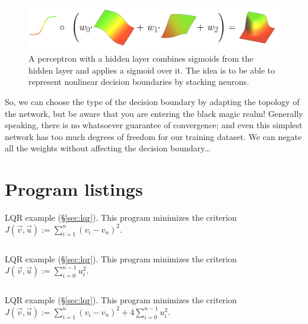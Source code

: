 \documentclass[notitlepage,oneside]{book}
\makeatletter
\newcommand{\authoredby}[1]{\addtocontents{toc}{\protect\@nameuse{authoredby#1}}}%
\makeatother
\begin{document}
\begin{figure}[t]
    \centering
    \includegraphics[width=.9\linewidth]{3n.jpg}
    \caption{A perceptron with a hidden layer combines sigmoids from the hidden layer and applies a sigmoid over it.
    The idea is to be able to represent nonlinear decision boundaries by stacking neurons.}
    \label{fig:sigmoids}
\end{figure}

So, we can choose the type of the decision boundary by adapting the topology of the network, but be aware that you are entering the black magic realm!
Generally speaking, there is no whatsoever guarantee of convergence; and even this simplest network has too much degrees of freedom for our training dataset.
We can negate all the weights without affecting the decision boundary\dots


\appendix
\authoredby{B}
\chapter{Program listings}
\fancyhead[R]{\textcolor{green}{core text}}

\begin{listing}[p]
\caption{LQR example (\S\ref{sec:lqr}). This program minimizes the criterion $J(\vec{v}, \vec{u}) := \sum\limits_{i=1}^n (v_i-v_n)^2$.}
\inputminted[frame=single,linenos=true]{python}{listings/example_6.1_a.py}
\label{listing:lqr1}
\end{listing}

\begin{listing}[p]
\caption{LQR example (\S\ref{sec:lqr}). This program minimizes the criterion $J(\vec{v}, \vec{u}) := \sum\limits_{i=0}^{n-1} u_i^2$.}
\inputminted[frame=single,linenos=true]{python}{listings/example_6.1_b.py}
\label{listing:lqr2}
\end{listing}

\begin{listing}[p]
\caption{LQR example (\S\ref{sec:lqr}). This program minimizes the criterion $J(\vec{v},\vec{u}) := \sum\limits_{i=1}^n (v_i-v_n)^2 + 4\sum\limits_{i=0}^{n-1} u_i^2$.}
\inputminted[frame=single,linenos=true]{python}{listings/example_6.1_c.py}
\label{listing:lqr3}
\end{listing}
\end{document}
